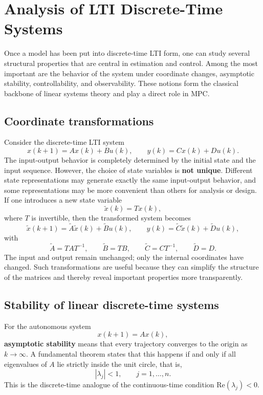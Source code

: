\section{Analysis of LTI Discrete-Time Systems}

Once a model has been put into discrete-time LTI form, one can study several structural properties that are central in estimation and control. Among the most important are the behavior of the system under coordinate changes, asymptotic stability, controllability, and observability. These notions form the classical backbone of linear systems theory and play a direct role in MPC.

\subsection{Coordinate transformations}

Consider the discrete-time LTI system
\[
x(k+1)=Ax(k)+Bu(k), \qquad y(k)=Cx(k)+Du(k).
\]
The input-output behavior is completely determined by the initial state and the input sequence. However, the choice of state variables is \textbf{not unique}. Different state representations may generate exactly the same input-output behavior, and some representations may be more convenient than others for analysis or design.\\
If one introduces a new state variable
\[
\tilde{x}(k)=Tx(k),
\]
where $T$ is invertible, then the transformed system becomes
\[
\tilde{x}(k+1)=\tilde{A}\tilde{x}(k)+\tilde{B}u(k), \qquad
y(k)=\tilde{C}\tilde{x}(k)+\tilde{D}u(k),
\]
with
\[
\tilde{A}=TAT^{-1}, \qquad \tilde{B}=TB, \qquad \tilde{C}=CT^{-1}, \qquad \tilde{D}=D.
\]
The input and output remain unchanged; only the internal coordinates have changed. Such transformations are useful because they can simplify the structure of the matrices and thereby reveal important properties more transparently.

\subsection{Stability of linear discrete-time systems}

For the autonomous system
\[
x(k+1)=Ax(k),
\]
\textbf{asymptotic stability} means that every trajectory converges to the origin as $k\to\infty$. A fundamental theorem states that this happens if and only if all eigenvalues of $A$ lie strictly inside the unit circle, that is,
\[
|\lambda_j|<1, \qquad j=1,\dots,n.
\]
This is the discrete-time analogue of the continuous-time condition $\mathrm{Re}(\lambda_j)<0$.\\\

